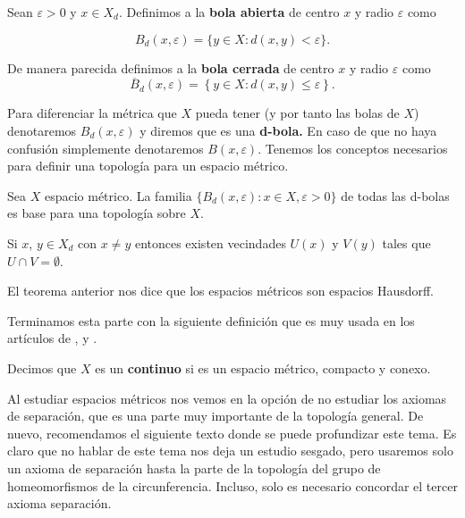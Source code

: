 \label{def:top-espacios-metricos}
\begin{df}
Sean $\varepsilon > 0$ y $x\in X_d$. Definimos a la \textbf{bola abierta} de centro $x$ y radio $\varepsilon$  como

$$B_{d}(x,\varepsilon)=\{ y \in X: d(x,y)< \varepsilon \}.$$

De manera parecida definimos a la \textbf{bola cerrada} de centro $x$ y radio $\varepsilon$  como
$$\overline{B}_{d}(x,\varepsilon)=\left\lbrace y \in X: d(x,y)\leq \varepsilon \right\rbrace.$$
\end{df}

Para diferenciar la métrica que $X$ pueda tener (y por tanto las bolas de $X$) denotaremos $B_{d}(x,\varepsilon)$ y diremos que es una \textbf{d-bola.} En caso de que no haya confusión simplemente denotaremos $B(x,\varepsilon)$. Tenemos los conceptos necesarios para definir una topología para un espacio métrico.

\begin{pr}\label{prp:bolas-bse}
Sea $X$ espacio métrico. La familia $\lbrace B_{d}(x,\varepsilon): x \in X, \varepsilon > 0\rbrace$ de todas las d-bolas es base para una topología sobre $X$.
\end{pr}


\begin{te}
Si $x$, $y \in X_{d}$ con $ x\neq y $ entonces existen vecindades $U(x)$ y $V(y)$ tales que $U \cap V=\emptyset$.
\end{te}

\begin{ob}\label{obs:espacios-metricos-son-hausdorff}
El teorema anterior nos dice que los espacios métricos son espacios Hausdorff.
\end{ob}

Terminamos esta parte con la siguiente definición que es muy usada en los artículos de \cite{kras}, \cite{why} y \cite{moore}.

\begin{df}
Decimos que $X$ es un \textbf{continuo} si es un espacio métrico, compacto y conexo.
\end{df}

Al estudiar espacios métricos nos vemos en la opción de no estudiar los axiomas de separación, que es una parte muy importante de la topología general. De nuevo, recomendamos el siguiente texto donde se puede profundizar este tema. Es claro que no hablar de este tema nos deja un estudio sesgado, pero usaremos solo un axioma de separación hasta la parte de la topología del grupo de homeomorfismos de la circunferencia. Incluso, solo es necesario concordar el tercer axioma separación. 


